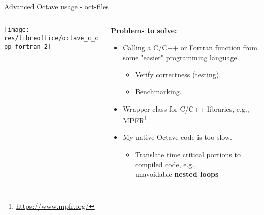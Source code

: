 \begin{frame}{Advanced Octave usage - oct-files}
\begin{columns}
\begin{column}{0.3\textwidth}
\begin{center}
\texttt{[image: res/libreoffice/octave\_c\_cpp\_fortran\_2]}
\end{center}
\end{column}
\begin{column}{0.65\textwidth}
\textbf{Problems to solve:}\\[0.8em]

\begin{itemize}
\itemsep1.5em
\item
Calling a C/C++ or Fortran function from some "easier" programming language.
\begin{itemize}
\item
Verify correctness (testing).

\item
Benchmarking.
\end{itemize}

\item
Wrapper class for C/C++-libraries, e.g., MPFR\footnote{\url{https://www.mpfr.org/}}.

\item
My native Octave code is too slow.
\begin{itemize}
\item
Translate time critical portions to compiled code, e.g., \\
unavoidable \textbf{nested loops}
\end{itemize}
\end{itemize}
\end{column}
\end{columns}
\end{frame}



